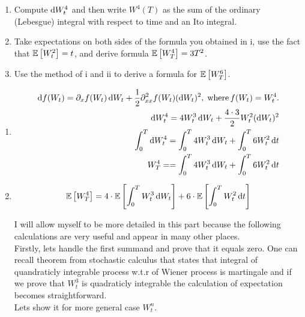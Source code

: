 \begin{exc}[Shreve 4.7]
	\begin{enumerate}[i]
		\item	Compute $\mathop{}\!\mathrm{d}{W^{4}_{t}}$ and then write $W^4(T)$ as the sum of the ordinary (Lebesgue) integral with respect to time and an Ito integral.
		\item 	Take expectations on both sides of the formula you obtained in i, use the fact that $\mathbb{E}\left[{W^2_t}\right] = t$, and derive formula $\mathbb{E}\left[{W^4_T}\right] = 3T^2$.\\
		\item   Use the method of i and ii to derive a formula for $\mathbb{E}\left[{W^6_T}\right]$.\\
	\end{enumerate}
\end{exc}

\begin{sol}
	\begin{enumerate}[i]
		\item \begin{equation}
			\begin{aligned}
				\diff f(W_t) =  \partial_{x} f(W_t) \diff W_t  +  \frac{1}{2}\partial^{2}_{xx} f(W_t) (\diff W_t)^2, \; \text{where} \, f(W_t) = W^4_t. \\
				\diff W^4_t = 4 W^3_t \diff W_t + \frac{4 \cdot 3}{2}  W^2_t (\diff W_t)^2 \\
				\int_{0}^{T}\diff W^4_t = \int_{0}^{T} 4 W^3_t \diff W_t + \int_{0}^{T} 6  W^2_t \diff t \\
				W^4_T = = \int_{0}^{T} 4 W^3_t \diff W_t + \int_{0}^{T} 6  W^2_t \diff t 
			\end{aligned}
		\end{equation}
	
		\item \begin{equation}
			\begin{aligned}
				\mathbb{E}\left[{W^4_T}\right] = 4 \cdot \mathbb{E}\left[{\int_{0}^{T}  W^3_t \mathop{}\!\mathrm{d}{W}_t}\right]  +  6 \cdot \mathbb{E}\left[{\int_{0}^{T} W^2_t \mathop{}\!\mathrm{d}{t} }\right] 
			\end{aligned}
		\end{equation}
	
	I will allow myself to be more detailed in this part because the following calculations are very useful and appear in many other places.\\
	Firstly, lets handle the first summand and prove that it equals zero. One can recall theorem from stochastic calculus that states that integral of quandraticly integrable process w.t.r of Wiener process is martingale and if we prove that $W^3_t$ is quadraticly integrable the calculation of expectation becomes straightforward. \\
	Lets show it for more general case  $W^n_t$.
	

\end{enumerate}
\end{sol}
